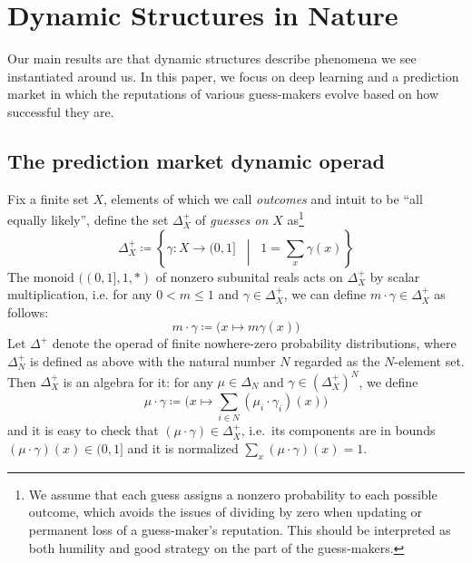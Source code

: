 \documentclass{eptcs}
\theoremstyle{definition}
\theoremstyle{plain}
\newcommand{\0}{\textsf{0}}
\newcommand{\1}{\tn{\textsf{1}}}
\newcommand{\bet}{\Delta^+}
\begin{document}
\section{Dynamic Structures in Nature}


Our main results are that dynamic structures describe phenomena we see instantiated around us. In this paper, we focus on deep learning and a prediction market in which the reputations of various guess-makers evolve based on how successful they are.


\subsection{The prediction market dynamic operad}\label{sec.kelley}


Fix a finite set $X$, elements of which we call \emph{outcomes} and intuit to be ``all equally likely'', define the set $\bet_X$ of \emph{guesses on $X$} as\footnote{We assume that each guess assigns a nonzero probability to each possible outcome, which avoids the issues of dividing by zero when updating or permanent loss of a guess-maker's reputation. This should be interpreted as both humility and good strategy on the part of the guess-makers.}
\[
	\bet_X\coloneqq\left\{\gamma\colon X\to(0,1]\;\;\middle|\;\;1=\sum_x\gamma(x) \right\}
\]
The monoid $((0,1],1,*)$ of nonzero subunital reals acts on $\bet_X$ by scalar multiplication, i.e. for any $0 < m\leq 1$ and $\gamma\in\bet_X$, we can define $m\cdot\gamma\in\bet_X$ as follows:
\[
	m\cdot \gamma\coloneqq \big(x\mapsto m\gamma (x)\big)
\]
Let $\Delta^+$ denote the operad of finite nowhere-zero probability distributions, where $\Delta^+_N$ is defined as above with the natural number $N$ regarded as the $N$-element set. %
Then $\bet_X$ is an algebra for it: for any $\mu\in\Delta_N$ and $\gamma \in (\bet_X)^N$, we define 
\[
	\mu\cdot\gamma\coloneqq\bigg(x\mapsto\sum_{i\in N}(\mu_i\cdot\gamma_i)(x)\bigg)
\]
and it is easy to check that $(\mu\cdot\gamma)\in\bet_X$, i.e.\ its components are in bounds $(\mu\cdot\gamma)(x)\in (0,1]$ and it is normalized $\sum_x(\mu\cdot\gamma)(x)=1$.
\end{document}
